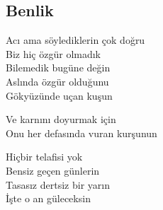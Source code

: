 \subsection{Benlik}

Acı ama söylediklerin çok doğru \\
Biz hiç özgür olmadık \\
Bilemedik bugüne değin \\
Aslında özgür olduğunu \\
Gökyüzünde uçan kuşun

\noindent\newline
Ve karnını doyurmak için \\
Onu her defasında vuran kurşunun

\noindent\newline
Hiçbir telafisi yok \\
Bensiz geçen günlerin \\
Tasasız dertsiz bir yarın \\
İşte o an güleceksin